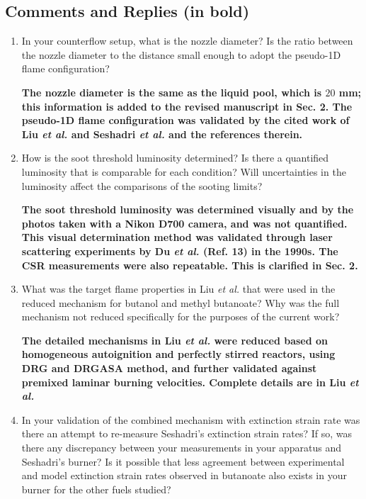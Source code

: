 \documentclass[10pt,letterpaper]{article}
\begin{document}
\subsection*{Comments and Replies (in bold)}

\begin{enumerate}
\item In your counterflow setup, what is the nozzle diameter? Is the ratio between the nozzle diameter to the distance small enough to adopt the pseudo-1D flame configuration?

\textbf{The nozzle diameter is the same as the liquid pool, which is $20$ mm; this information is added to the revised manuscript in Sec. 2.  The pseudo-1D flame configuration was validated by the cited work of Liu \emph{et al.} and Seshadri \emph{et al.} and the references therein.}

\item How is the soot threshold luminosity determined? Is there a quantified luminosity that is comparable for each condition? Will uncertainties in the luminosity affect the comparisons of the sooting limits?

\textbf{The soot threshold luminosity was determined visually and by the photos taken with a Nikon D700 camera, and was not quantified.  This visual determination method was validated through laser scattering experiments by Du \emph{et al.} (Ref. 13) in the 1990s. The CSR measurements were also repeatable.  This is clarified in Sec. 2.}

\item What was the target flame properties in Liu \emph{et al.} that were used in the reduced mechanism for butanol and methyl butanoate? Why was the full mechanism not reduced specifically for the purposes of the current work?

\textbf{The detailed mechanisms in Liu \emph{et al.} were reduced based on homogeneous autoignition and perfectly stirred reactors, using DRG and DRGASA method, and further validated against premixed laminar burning velocities.  Complete details are in Liu \emph{et al.} }

\item In your validation of the combined mechanism with extinction strain rate was there an attempt to re-measure Seshadri's extinction strain rates? If so, was there any discrepancy between your measurements in your apparatus and Seshadri's burner? Is it possible that less agreement between experimental and model extinction strain rates observed in butanoate also exists in your burner for the other fuels studied?


\end{enumerate}
\end{document}
